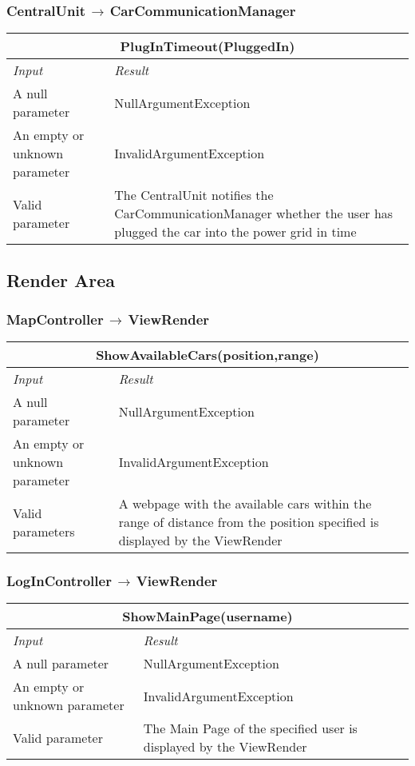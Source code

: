 \documentclass[11pt,a4paper]{report}
\begin{document}
\subsubsection{CentralUnit$\,\to\,$CarCommunicationManager}
\begin{tabularx}{\textwidth}{|X|X|}
	\hline
	\multicolumn{2}{|c|}{\textbf{PlugInTimeout(PluggedIn)}}\\
	\hline
	\textit{Input} & \textit{Result}\\
	\hline
	A null parameter & NullArgumentException\\
	\hline
	An empty or unknown parameter & InvalidArgumentException\\
	\hline
	Valid parameter & The CentralUnit notifies the CarCommunicationManager whether the user has plugged the car into the power grid in time\\
	\hline
\end{tabularx}
\subsection{Render Area}
\subsubsection{MapController$\,\to\,$ViewRender}
\begin{tabularx}{\textwidth}{|X|X|}
	\hline
	\multicolumn{2}{|c|}{\textbf{ShowAvailableCars(position,range)}}\\
	\hline
	\textit{Input} & \textit{Result}\\
	\hline
	A null parameter & NullArgumentException\\
	\hline
	An empty or unknown parameter & InvalidArgumentException\\
	\hline
	Valid parameters & A webpage with the available cars within the range of distance from the position specified is displayed by the ViewRender\\
	\hline
\end{tabularx}
\subsubsection{LogInController$\,\to\,$ViewRender}
\begin{tabularx}{\textwidth}{|X|X|}
	\hline
	\multicolumn{2}{|c|}{\textbf{ShowMainPage(username)}}\\
	\hline
	\textit{Input} & \textit{Result}\\
	\hline
	A null parameter & NullArgumentException\\
	\hline
	An empty or unknown parameter & InvalidArgumentException\\
	\hline
	Valid parameter & The Main Page of the specified user is displayed by the ViewRender\\
	\hline
\end{tabularx}
\end{document}
